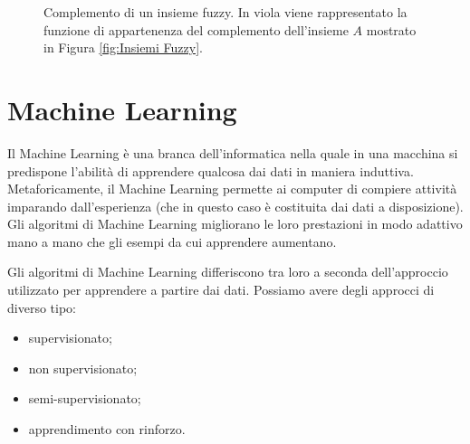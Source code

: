 \documentclass[a4paper,12pt]{report}
\begin{document}
\begin{figure}[ht]
    \centering
    \caption{Complemento di un insieme fuzzy. In viola viene rappresentato la funzione di appartenenza del complemento dell'insieme $A$ mostrato in Figura \ref{fig:Insiemi Fuzzy}.} 
    \label{fig:Complemento_insieme_fuzzy}  

\end{figure}


\section{Machine Learning}
Il Machine Learning \cite{machine_learning_oreilly} è una branca dell'informatica nella quale in una macchina si predispone l'abilità di apprendere qualcosa dai dati in maniera induttiva.
Metaforicamente, il Machine Learning permette ai computer di compiere attività imparando dall'esperienza (che in questo caso è costituita dai dati a disposizione). \newline
Gli algoritmi di Machine Learning migliorano le loro prestazioni in modo adattivo mano a mano che gli esempi da cui apprendere aumentano.

\bigskip
Gli algoritmi di Machine Learning differiscono tra loro a seconda dell'approccio utilizzato per apprendere a partire dai dati.
Possiamo avere degli approcci di diverso tipo:
\begin{itemize}
    \item supervisionato;
    \item non supervisionato;
    \item semi-supervisionato;
    \item apprendimento con rinforzo.
\end{itemize}
\end{document}

